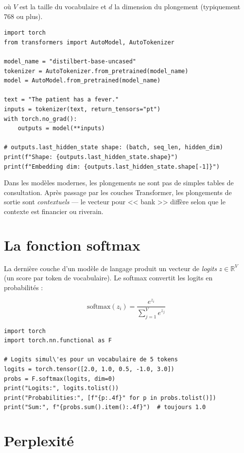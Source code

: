 o\`u $V$ est la taille du vocabulaire et $d$ la dimension du plongement (typiquement 768 ou plus).

\begin{verbatim}
import torch
from transformers import AutoModel, AutoTokenizer

model_name = "distilbert-base-uncased"
tokenizer = AutoTokenizer.from_pretrained(model_name)
model = AutoModel.from_pretrained(model_name)

text = "The patient has a fever."
inputs = tokenizer(text, return_tensors="pt")
with torch.no_grad():
    outputs = model(**inputs)

# outputs.last_hidden_state shape: (batch, seq_len, hidden_dim)
print(f"Shape: {outputs.last_hidden_state.shape}")
print(f"Embedding dim: {outputs.last_hidden_state.shape[-1]}")
\end{verbatim}

\begin{aitip}
Dans les mod\`eles modernes, les plongements ne sont pas de simples tables de consultation. Apr\`es passage par les couches Transformer, les plongements de sortie sont \emph{contextuels} --- le vecteur pour << bank >> diff\`ere selon que le contexte est financier ou riverain.
\end{aitip}

\section{La fonction softmax}

La derni\`ere couche d'un mod\`ele de langage produit un vecteur de \emph{logits} $z \in \mathbb{R}^V$ (un score par token de vocabulaire). Le softmax convertit les logits en probabilit\'es :

\[
\text{softmax}(z_i) = \frac{e^{z_i}}{\sum_{j=1}^{V} e^{z_j}}
\]

\begin{verbatim}
import torch
import torch.nn.functional as F

# Logits simul\'es pour un vocabulaire de 5 tokens
logits = torch.tensor([2.0, 1.0, 0.5, -1.0, 3.0])
probs = F.softmax(logits, dim=0)
print("Logits:", logits.tolist())
print("Probabilities:", [f"{p:.4f}" for p in probs.tolist()])
print("Sum:", f"{probs.sum().item():.4f}")  # toujours 1.0
\end{verbatim}

\section{Perplexit\'e}
\label{sec:perplexity}

